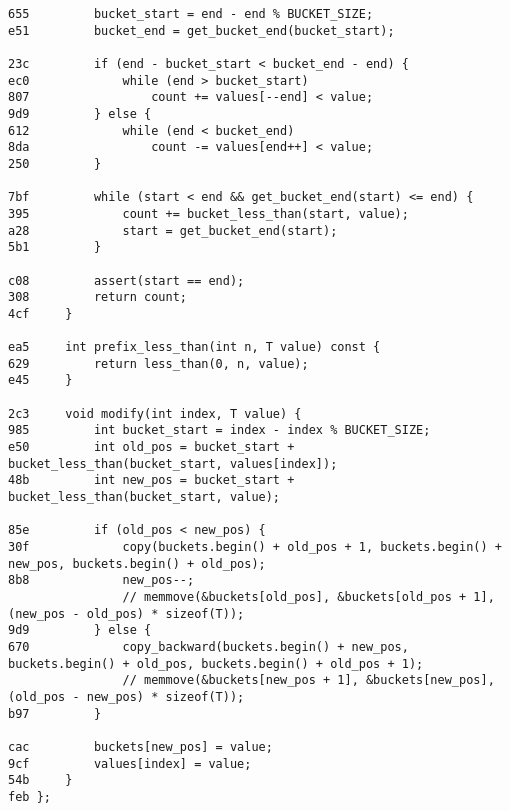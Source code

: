 \documentclass[11pt, a4paper, twoside]{article}
\begin{document}
\begin{lstlisting}
655         bucket_start = end - end % BUCKET_SIZE;
e51         bucket_end = get_bucket_end(bucket_start);
    
23c         if (end - bucket_start < bucket_end - end) {
ec0             while (end > bucket_start)
807                 count += values[--end] < value;
9d9         } else {
612             while (end < bucket_end)
8da                 count -= values[end++] < value;
250         }
    
7bf         while (start < end && get_bucket_end(start) <= end) {
395             count += bucket_less_than(start, value);
a28             start = get_bucket_end(start);
5b1         }
    
c08         assert(start == end);
308         return count;
4cf     }
    
ea5     int prefix_less_than(int n, T value) const {
629         return less_than(0, n, value);
e45     }
    
2c3     void modify(int index, T value) {
985         int bucket_start = index - index % BUCKET_SIZE;
e50         int old_pos = bucket_start + bucket_less_than(bucket_start, values[index]);
48b         int new_pos = bucket_start + bucket_less_than(bucket_start, value);
    
85e         if (old_pos < new_pos) {
30f             copy(buckets.begin() + old_pos + 1, buckets.begin() + new_pos, buckets.begin() + old_pos);
8b8             new_pos--;
                // memmove(&buckets[old_pos], &buckets[old_pos + 1], (new_pos - old_pos) * sizeof(T));
9d9         } else {
670             copy_backward(buckets.begin() + new_pos, buckets.begin() + old_pos, buckets.begin() + old_pos + 1);
                // memmove(&buckets[new_pos + 1], &buckets[new_pos], (old_pos - new_pos) * sizeof(T));
b97         }
    
cac         buckets[new_pos] = value;
9cf         values[index] = value;
54b     }
feb };
\end{lstlisting}
\end{document}
